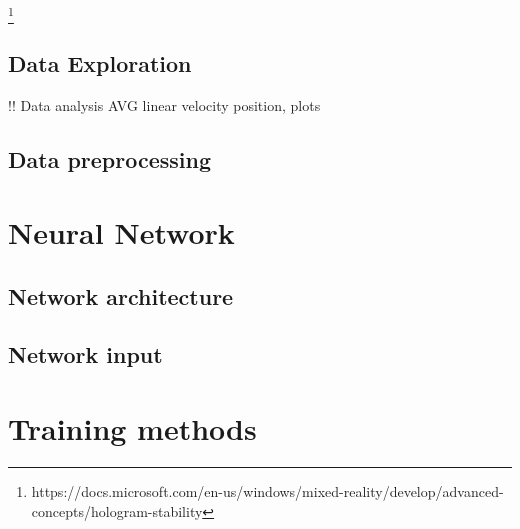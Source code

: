 \footnote{https://docs.microsoft.com/en-us/windows/mixed-reality/develop/advanced-concepts/hologram-stability}

\subsection{Data Exploration}
\label{sec:design:dataset:explor}
!! Data analysis AVG linear velocity position, plots 

\subsection{Data preprocessing}
\label{sec:design:dataset:preprocessing}


\section{Neural Network}
\label{sec:design:nn}

\subsection{Network architecture}
\label{sec:design:nn:architecture}

\subsection{Network input}
\label{sec:design:nn:input}


\section{Training methods}
\label{sec:design:train}
